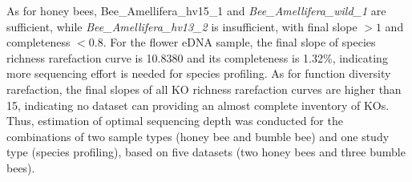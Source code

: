 \documentclass[11pt]{article}
\begin{document}
    As for honey bees, {Bee\_Amellifera\_hv15\_1} and \textit{Bee\_Amellifera\_wild\_1} are sufficient, while \textit{Bee\_Amellifera\_hv13\_2} is insufficient, with final slope $> 1$ and completeness $< 0.8$. 
    For the flower eDNA sample, the final slope of species richness rarefaction curve is 10.8380 and its completeness is 1.32\%, indicating more sequencing effort is needed for species profiling. 
    As for function diversity rarefaction, the final slopes of all KO richness rarefaction curves are higher than 15, indicating no dataset can providing an almost complete inventory of KOs. 
    Thus, estimation of optimal sequencing depth was conducted for the combinations of two sample types (honey bee and bumble bee) and one study type (species profiling), based on five datasets (two honey bees and three bumble bees).
\end{document}
